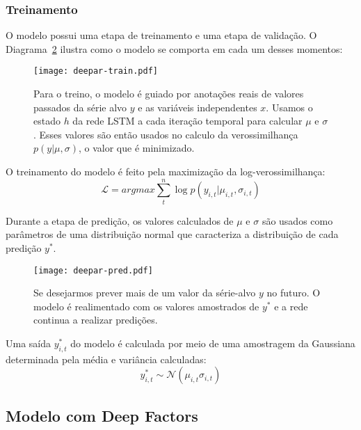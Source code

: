 \subsubsection{Treinamento}


O modelo possui uma etapa de treinamento e uma etapa de validação. O Diagrama~\ref{fig:deepartrain} ilustra como o modelo se comporta em cada um desses momentos: \\


\begin{figure}[H]
  \centering
  \texttt{[image: deepar-train.pdf]}
  \caption{Para o treino, o modelo é guiado por anotações reais de valores
    passados da série alvo $y$ e as variáveis independentes $x$. Usamos o estado
  $h$ da rede LSTM a cada iteração temporal para calcular $\mu$  e $\sigma$.
  Esses valores são então usados no calculo da verossimilhança $p(y |
  \mu,\sigma)$, o valor que é minimizado.}
  \label{fig:deepartrain}
\end{figure}


O treinamento do modelo é feito pela maximização da log-verossimilhança: \\

\begin{equation}
  \mathcal{L} = argmax \sum^n_t{\log p(y_{i,t} | \mu_{i,t},\sigma_{i,t})}
  \end{equation}

Durante a etapa de predição, os valores calculados de $\mu$ e $\sigma$ são
usados como parâmetros de uma distribuição normal que caracteriza a distribuição
de cada predição $y^*$.


\begin{figure}[H]
  \centering
  \texttt{[image: deepar-pred.pdf]}
  \caption{Se desejarmos prever mais de um valor da série-alvo $y$ no futuro. O
    modelo é realimentado com os valores amostrados de $y^*$ e a rede continua a
  realizar predições.}
  \label{fig:deepartrain}
\end{figure}


Uma saída $y^*_{i,t}$ do modelo é calculada por meio de uma amostragem da Gaussiana determinada pela média e variância calculadas: \\

\[
 y^*_{i,t} \sim \mathcal{N}(\mu_{i,t}\sigma_{i,t}) 
\]

\subsection{Modelo com Deep Factors}

